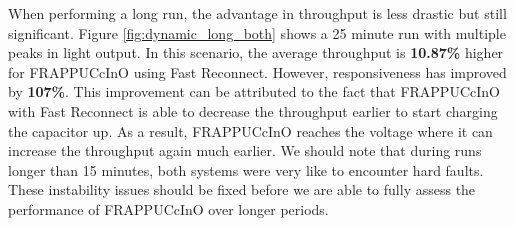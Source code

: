 When performing a long run, the advantage in throughput is less drastic but still significant. Figure \ref{fig:dynamic_long_both} shows a 25 minute run with multiple peaks in light output. In this scenario, the average throughput is \textbf{10.87\%} higher for FRAPPUCcInO using Fast Reconnect. However, responsiveness has improved by \textbf{107\%}. This improvement can be attributed to the fact that FRAPPUCcInO with Fast Reconnect is able to decrease the throughput earlier to start charging the capacitor up. As a result, FRAPPUCcInO reaches the voltage where it can increase the throughput again much earlier. We should note that during runs longer than 15 minutes, both systems were very like to encounter hard faults. These instability issues should be fixed before we are able to fully assess the performance of FRAPPUCcInO over longer periods.